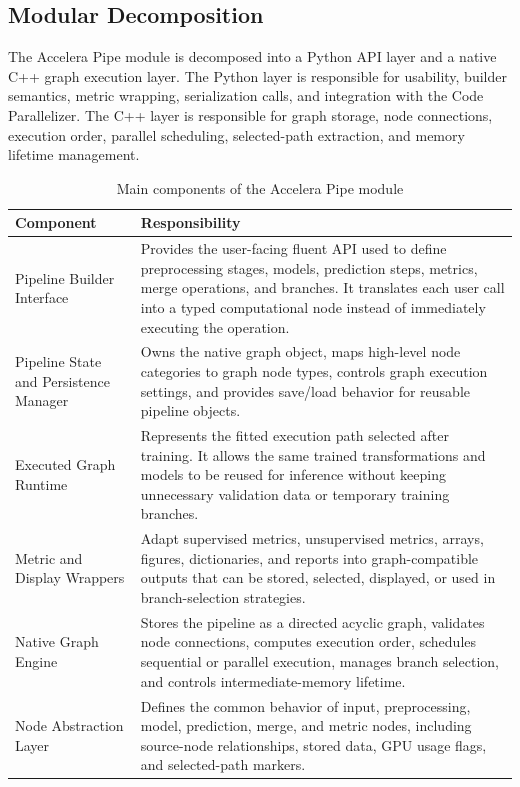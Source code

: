 \subsection{Modular Decomposition}

The Accelera Pipe module is decomposed into a Python API layer and a native C++
graph execution layer. The Python layer is responsible for usability, builder
semantics, metric wrapping, serialization calls, and integration with the Code
Parallelizer. The C++ layer is responsible for graph storage, node connections,
execution order, parallel scheduling, selected-path extraction, and memory
lifetime management.


\begin{table}[H]
\centering
\caption{Main components of the Accelera Pipe module}
\begin{tabular}{p{}p{}}
\toprule
Component & Responsibility \\
\midrule
Pipeline Builder Interface & Provides the user-facing fluent API used to define preprocessing stages, models, prediction steps, metrics, merge operations, and branches. It translates each user call into a typed computational node instead of immediately executing the operation. \\
Pipeline State and Persistence Manager & Owns the native graph object, maps high-level node categories to graph node types, controls graph execution settings, and provides save/load behavior for reusable pipeline objects. \\
Executed Graph Runtime & Represents the fitted execution path selected after training. It allows the same trained transformations and models to be reused for inference without keeping unnecessary validation data or temporary training branches. \\
Metric and Display Wrappers & Adapt supervised metrics, unsupervised metrics, arrays, figures, dictionaries, and reports into graph-compatible outputs that can be stored, selected, displayed, or used in branch-selection strategies. \\
Native Graph Engine & Stores the pipeline as a directed acyclic graph, validates node connections, computes execution order, schedules sequential or parallel execution, manages branch selection, and controls intermediate-memory lifetime. \\
Node Abstraction Layer & Defines the common behavior of input, preprocessing, model, prediction, merge, and metric nodes, including source-node relationships, stored data, GPU usage flags, and selected-path markers. \\
\bottomrule
\end{tabular}
\end{table}

